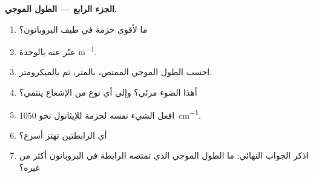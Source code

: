 \begin{problem}
\medskip
\noindent\textbf{الجزء الرابع --- الطول الموجي.}
\begin{enumerate}[resume]
  \item ما  لأقوى حزمة في طيف البروبانون؟
  \item عبّر عنه بالوحدة \si{m^{-1}}.
  \item احسب الطول الموجي الممتص، بالمتر، ثم
        بالميكرومتر.
  \item أهذا الضوء مرئي؟ وإلى أي نوع من الإشعاع
        ينتمي؟
  \item افعل الشيء نفسه لحزمة  للإيثانول نحو
        \qty{1050}{cm^{-1}}.
  \item أي الرابطتين تهتز أسرع؟
  \item اذكر الجواب النهائي: ما الطول الموجي الذي تمتصه الرابطة 
        في البروبانون أكثر من غيره؟
\end{enumerate}
\end{problem}
